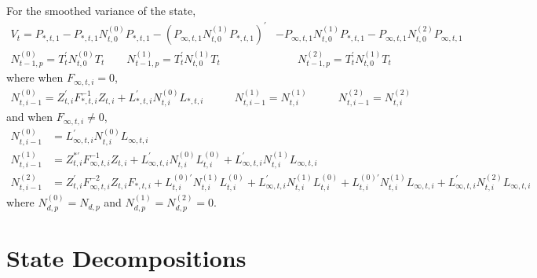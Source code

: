 \documentclass[12pt]{article}
\newcommand{\Cov}[0]{\text{Cov}}
\newcommand{\Var}[0]{\text{Var}}
\newcommand{\flag}[0]{red}
\begin{document}
	For the smoothed variance of the state, 
	\begin{align*}
	V_t = P_{*,t,1} - P_{*,t,1} N_{t,0}^{(0)} P_{*,t,1} - \left(P_{\infty,t,1} N_{t,0}^{(1)} P_{*,t,1} \right)^\prime &- P_{\infty,t,1} N_{t,0}^{(1)} P_{*,t,1} - P_{\infty,t,1} N_{t,0}^{(2)} P_{\infty,t,1} \\
	N_{t-1,p}^{(0)} = T_t^\prime N_{t,0}^{(0)} T_t \qquad
	N_{t-1,p}^{(1)} = T_t^\prime N_{t,0}^{(1)} T_t &\qquad
	N_{t-1,p}^{(2)} = T_t^\prime N_{t,0}^{(1)} T_t 
	\end{align*}
	where when $F_{\infty,t,i} = 0$, 
	\begin{align*}
	N_{t,i-1}^{(0)} = Z_{t,i}^\prime F_{*,t,i}^{-1} Z_{t,i} + L_{*,t,i}^\prime N_{t,i}^{(0)} L_{*,t,i} &\qquad
	N_{t,i-1}^{(1)} = N_{t,i}^{(1)} &\qquad
	N_{t,i-1}^{(2)} = N_{t,i}^{(2)} 
	\end{align*}
	and when $F_{\infty,t,i} \neq 0$,
	\begin{align*}
	N_{t,i-1}^{(0)} &= L_{\infty,t,i}^\prime N_{t,i}^{(0)} L_{\infty,t,i}\\
	N_{t,i-1}^{(1)} &= Z_{t,i}^{*\prime} F_{\infty,t,i}^{-1} Z_{t,i} + L_{\infty,t,i}^\prime N_{t,i}^{(0)} L_{t,i}^{(0)} + L_{\infty,t,i}^\prime N_{t,i}^{(1)} L_{\infty,t,i}  \\
	N_{t,i-1}^{(2)} &= Z_{t,i}^\prime F_{\infty,t,i}^{-2} Z_{t,i} F_{*,t,i} + L_{t,i}^{(0)\prime} N_{t,i}^{(1)} L_{t,i}^{(0)} + L_{\infty,t,i}^\prime N_{t,i}^{(1)} L_{t,i}^{(0)} + L_{t,i}^{(0)\prime} N_{t,i}^{(1)} L_{\infty,t,i} + L_{\infty,t,i}^\prime N_{t,i}^{(2)} L_{\infty,t,i}
	\end{align*}
	where $N_{d,p}^{(0)} = N_{d,p}$ and $N_{d,p}^{(1)} = N_{d,p}^{(2)} = 0$. 



\section{State Decompositions}
	
\end{document}
